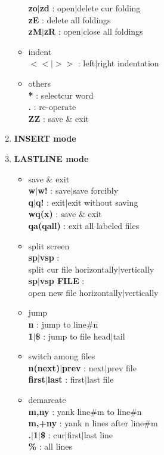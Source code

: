 \documentclass[10pt, a4paper]{article}
\begin{document}
\begin{enumerate}
\begin{itemize}
    \textbf{zo{$|$}zd} : open{$|$}delete cur folding \\
    \textbf{zE} : delete all foldings \\
    \textbf{zM{$|$}zR} : open{$|$}close all foldings
    \item indent \\
    \textbf{$<<${$|$}$>>$} : left{$|$}right indentation
    \item others \\
    \textbf{*} : selectcur word \\
    \textbf{.} : re-operate \\
    \textbf{ZZ} : save \& exit
    \end{itemize}
\item{\textbf{INSERT mode}}
\item{\textbf{LASTLINE mode}}
    \begin{itemize}
    \item save \& exit \\
    \textbf{w{$|$}w!} : save{$|$}save forcibly \\
    \textbf{q{$|$}q!} : exit{$|$}exit without saving \\
    \textbf{wq(x)} : save \& exit \\
    \textbf{qa(qall)} : exit all labeled files
    \item split screen \\
    \textbf{sp{$|$}vsp} : \\ split cur file horizontally{$|$}vertically \\
    \textbf{sp{$|$}vsp FILE} : \\ open new file horizontally{$|$}vertically
    \item jump \\
    \textbf{n} : jump to line\#n \\
    \textbf{1{$|$}\$} : jump to file head{$|$}tail
    \item switch among files \\
    \textbf{n(next){$|$}prev} : next{$|$}prev file \\
    \textbf{first{$|$}last} : first{$|$}last file
    \item demarcate \\
    \textbf{m,ny} : yank line\#m to line\#n \\
    \textbf{m,+ny} : yank n lines after line\#m \\
    \textbf{.{$|$}1{$|$}\$} : cur{$|$}first{$|$}last line \\
    \textbf{\%} : all lines

\end{itemize}
\end{enumerate}
\end{document}
